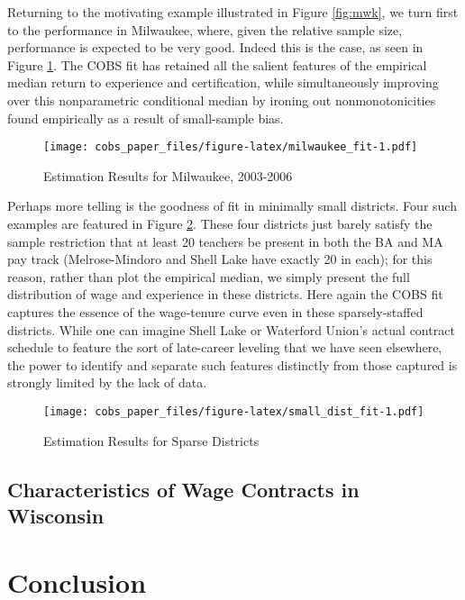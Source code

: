 \documentclass[]{article}
\begin{document}
Returning to the motivating example illustrated in Figure \ref{fig:mwk},
we turn first to the performance in Milwaukee, where, given the relative
sample size, performance is expected to be very good. Indeed this is the
case, as seen in Figure \ref{fig:mwk_fit}. The COBS fit has retained all
the salient features of the empirical median return to experience and
certification, while simultaneously improving over this nonparametric
conditional median by ironing out nonmonotonicities found empirically as
a result of small-sample bias.

\begin{figure}[htbp]
\centering
\texttt{[image: cobs\_paper\_files/figure-latex/milwaukee\_fit-1.pdf]}
\caption{\label{fig:mwk_fit}Estimation Results for Milwaukee, 2003-2006}
\end{figure}

Perhaps more telling is the goodness of fit in minimally small
districts. Four such examples are featured in Figure
\ref{fig:small_fit}. These four districts just barely satisfy the sample
restriction that at least 20 teachers be present in both the BA and MA
pay track (Melrose-Mindoro and Shell Lake have exactly 20 in each); for
this reason, rather than plot the empirical median, we simply present
the full distribution of wage and experience in these districts. Here
again the COBS fit captures the essence of the wage-tenure curve even in
these sparsely-staffed districts. While one can imagine Shell Lake or
Waterford Union's actual contract schedule to feature the sort of
late-career leveling that we have seen elsewhere, the power to identify
and separate such features distinctly from those captured is strongly
limited by the lack of data.

\begin{figure}[htbp]
\centering
\texttt{[image: cobs\_paper\_files/figure-latex/small\_dist\_fit-1.pdf]}
\caption{\label{fig:small_fit}Estimation Results for Sparse Districts}
\end{figure}

\subsection{Characteristics of Wage Contracts in
Wisconsin}\label{characteristics-of-wage-contracts-in-wisconsin}

\section{Conclusion}\label{conclusion}
\end{document}
